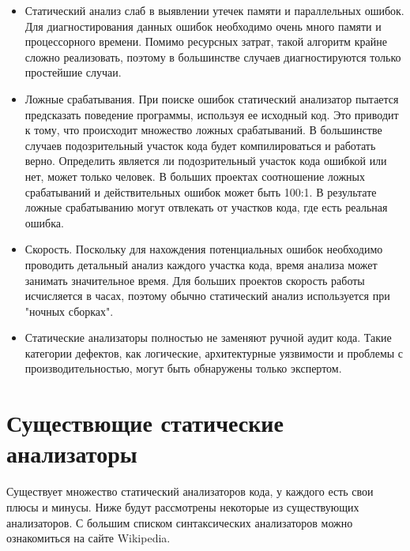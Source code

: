 \begin{itemize}
	\item Статический анализ слаб в выявлении утечек памяти и параллельных ошибок.
	Для диагностирования данных ошибок необходимо очень много памяти и процессорного времени. 
Помимо ресурсных затрат, такой алгоритм крайне сложно реализовать, поэтому в большинстве случаев 
диагностируются только простейшие случаи.  
	
	\item Ложные срабатывания.
	При поиске ошибок статический анализатор пытается предсказать поведение программы, используя
ее исходный код. Это приводит к тому, что происходит множество ложных срабатываний. В большинстве случаев 
подозрительный участок кода будет компилироваться и работать верно. Определить является ли  
подозрительный участок кода ошибкой или нет, может только человек. В больших проектах соотношение 
ложных срабатываний и действительных ошибок может быть 100:1. В результате ложные срабатыванию могут 
отвлекать от участков кода, где есть реальная ошибка.
	
	\item Скорость.
	Поскольку для нахождения потенциальных ошибок необходимо проводить детальный анализ каждого
участка кода, время анализа может занимать значительное время. Для больших проектов скорость работы
исчисляется в часах, поэтому обычно статический анализ используется при "ночных сборках".
	
	\item Статические анализаторы полностью не заменяют ручной аудит кода. 
	Такие категории дефектов, как логические, архитектурные уязвимости и проблемы с производительностью,
могут быть обнаружены только экспертом.
\end{itemize}

\section{Существющие статические анализаторы}

Существует множество статический анализаторов кода, у каждого есть свои плюсы и минусы. 
Ниже будут рассмотрены некоторые из существующих анализаторов. С большим списком синтаксических
анализаторов можно ознакомиться на сайте Wikipedia.

